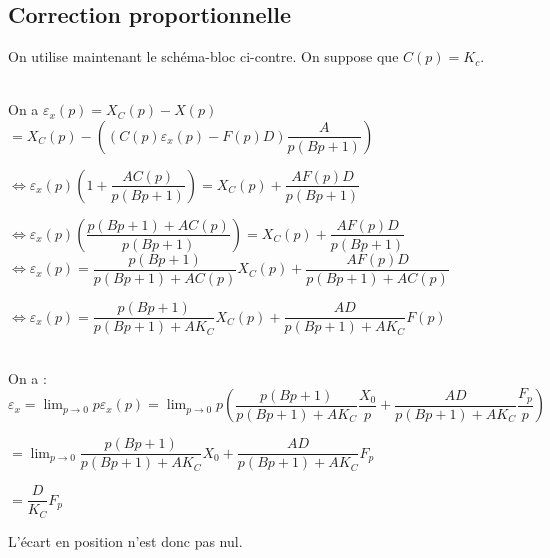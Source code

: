 
\fi
\subsection*{Correction proportionnelle}
\ifcolle
On utilise maintenant le schéma-bloc ci-contre.
\else
\fi
On suppose que $C(p)=K_c$. 


\ifprof
\begin{corrige}~\\
On a $\varepsilon_x(p)=X_C(p)-X(p)$ 
$ =X_C(p)-\left(\left(C(p)\varepsilon_x(p)-F(p)D \right)\dfrac{A}{p\left(Bp+1 \right)}  \right) $

$\Leftrightarrow \varepsilon_x(p) \left(1+ \dfrac{AC(p)}{p\left(Bp+1 \right)}\right)=X_C(p)+\dfrac{AF(p)D }{p\left(Bp+1 \right)}   $

$\Leftrightarrow \varepsilon_x(p) \left( \dfrac{p\left(Bp+1 \right)+AC(p)}{p\left(Bp+1 \right)}\right)=X_C(p)+\dfrac{AF(p)D }{p\left(Bp+1 \right)}   $
$\Leftrightarrow \varepsilon_x(p) =\dfrac{p\left(Bp+1 \right)}{p\left(Bp+1 \right)+AC(p)}X_C(p)+\dfrac{AF(p)D }{p\left(Bp+1 \right)+AC(p)}  $

$\Leftrightarrow \varepsilon_x(p) =\dfrac{p\left(Bp+1 \right)}{p\left(Bp+1 \right)+AK_C}X_C(p)+\dfrac{AD }{p\left(Bp+1 \right)+AK_C} F(p) $
\end{corrige}
\else
\fi



\ifprof
\begin{corrige}~\\

On a : 
$\varepsilon_x = \lim_{p\to 0} p\varepsilon_x(p) = \lim_{p\to 0} p\left(\dfrac{p\left(Bp+1 \right)}{p\left(Bp+1 \right)+AK_C}\dfrac{X_0}{p}+\dfrac{AD }{p\left(Bp+1 \right)+AK_C} \dfrac{F_p}{p}\right) $

$= \lim_{p\to 0} \dfrac{p\left(Bp+1 \right)}{p\left(Bp+1 \right)+AK_C}{X_0}+\dfrac{AD }{p\left(Bp+1 \right)+AK_C} {F_p} $

$= \dfrac{D }{K_C} {F_p} $

L'écart en position n'est donc pas nul.
\end{corrige}
\else
\fi

